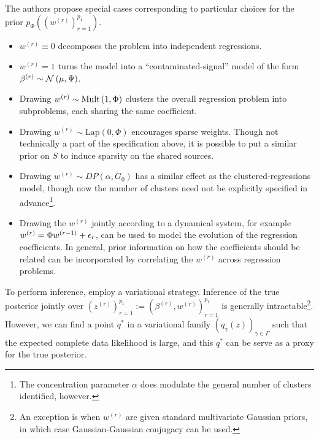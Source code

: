 \documentclass{article}
\begin{document}
The authors propose special cases corresponding to particular choices for the
prior $p_{\Phi}\left(\left(w^{(r)}\right)_{r = 1}^{p_{1}}\right)$.
\begin{itemize}
  \item $w^{(r)} \equiv 0$ decomposes the problem into independent regressions.
  \item $w^{(r)} = 1$ turns the model into a ``contaminated-signal'' model of
    the form $\beta^{(r)} \sim \mathcal{N}\left(\mu, \Psi\right)$.
  \item Drawing $w^{(r)} \sim \textnormal{Mult}\left(1, \Phi\right)$ clusters the overall
    regression problem into subproblems, each sharing the same coefficient.
  \item Drawing $w^{(r)} \sim \text{Lap}\left(0, \Phi\right)$ encourages sparse
    weights. Though not technically a part of the specification above, it is
    possible to put a similar prior on $S$ to induce sparsity on the shared
    sources.
  \item Drawing $w^{(r)} \sim DP\left(\alpha, G_{0}\right)$ has a similar effect
    as the clustered-regressions model, though now the number of clusters need
    not be explicitly specified in advance\footnote{The concentration parameter
      $\alpha$ does modulate the general number of clusters identified,
      however.}.
  \item Drawing the $w^{(r)}$ jointly according to a dynamical system, for
    example $w^{(r)} = \Phi w^{(r - 1)} + \epsilon_{r}$, can be used to model the
    evolution of the regression coefficients. In general, prior information on
    how the coefficients should be related can be incorporated by correlating
    the $w^{(r)}$ across regression problems.
\end{itemize}
To perform inference, \cite{zhang2005learning} employ a variational strategy.
Inference of the true posterior jointly over $\left(z^{(r)}\right)_{r =
  1}^{p_{1}} := \left(\beta^{(r)}, w^{(r)}\right)_{r = 1}^{p_{1}}$ is generally
intractable\footnote{An exception is when $w^{(r)}$ are given standard
  multivariate Gaussian priors, in which case Gaussian-Gaussian conjugacy can be
  used.}. However, we can find a point $q^{\ast}$ in a variational family
$\left(q_{\gamma}\left(z\right)\right)_{\gamma \in \Gamma}$ such that the
expected complete data likelihood is large, and this $q^{\ast}$ can be serve as
a proxy for the true posterior.
\end{document}
